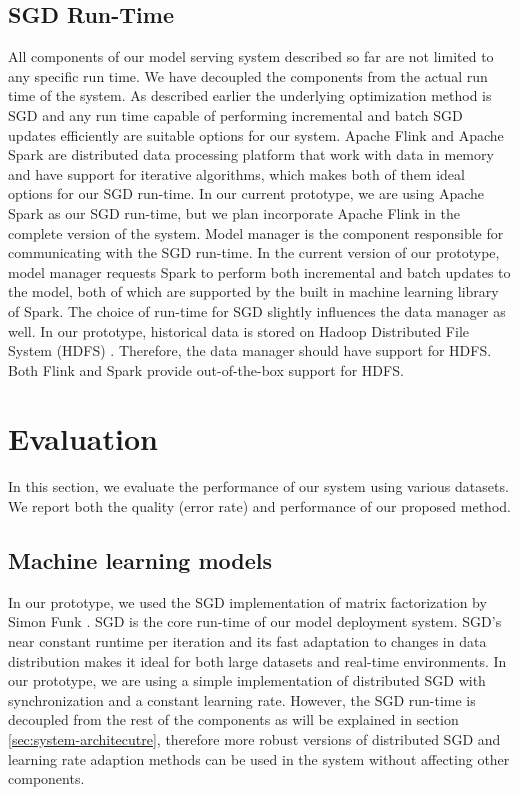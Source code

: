 \documentclass{vldb}
\begin{document}
\subsection{SGD Run-Time} 
All components of our model serving system described so far are not limited to any specific run time.
We have decoupled the components from the actual run time of the system.
As described earlier the underlying optimization method is SGD and any run time capable of performing incremental and batch SGD updates efficiently are suitable options for our system.
Apache Flink \cite{carbone2015apache} and Apache Spark \cite{zaharia2010spark} are distributed data processing platform that work with data in memory and have support for iterative algorithms, which makes both of them ideal options for our SGD run-time.
In our current prototype, we are using Apache Spark \cite{zaharia2010spark} as our SGD run-time, but we plan incorporate Apache Flink in the complete version of the system.
Model manager is the component responsible for communicating with the SGD run-time.
In the current version of our prototype, model manager requests Spark to perform both incremental and batch updates to the model, both of which are supported by the built in machine learning library of Spark.
The choice of run-time for SGD slightly influences the data manager as well.
In our prototype, historical data is stored on Hadoop Distributed File System (HDFS) \cite{shvachko2010hadoop}.
Therefore, the data manager should have support for HDFS.
Both Flink and Spark provide out-of-the-box support for HDFS.

\section{Evaluation} \label{evaluation} 
In this section, we evaluate the performance of our system using various datasets. 
We report both the quality (error rate) and performance of our proposed method. 


\subsection{Machine learning models}
In our prototype, we used the SGD implementation of matrix factorization by Simon Funk \cite{funk2006netflix}. 
SGD is the core run-time of our model deployment system.
SGD's near constant runtime per iteration and its fast adaptation to changes in data distribution makes it ideal for both large datasets and real-time environments.
In our prototype, we are using a simple implementation of distributed SGD with synchronization and a constant learning rate.
However, the SGD run-time is decoupled from the rest of the components as will be explained in section \ref{sec:system-architecutre}, therefore more robust versions of distributed SGD and learning rate adaption methods can be used in the system without affecting other components.
\end{document}
